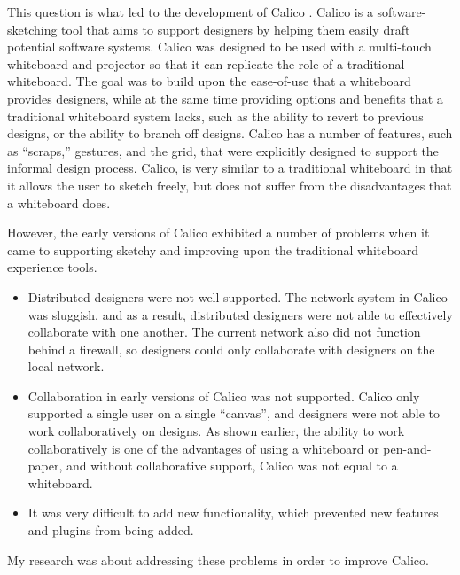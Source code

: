 This question is what led to the development of Calico \cite{calico2}. 
Calico is a software-sketching tool that aims to support designers by helping them easily draft potential software systems. 
Calico was designed to be used with a multi-touch whiteboard and projector so that it can replicate the role of a traditional whiteboard. 
The goal was to build upon the ease-of-use that a whiteboard provides designers, while at the same time providing options and benefits that a traditional whiteboard system lacks, such as the ability to revert to previous designs, or the ability to branch off designs. 
Calico has a number of features, such as ``scraps,'' gestures, and the grid, that were explicitly designed to support the informal design process.
Calico, is very similar to a traditional whiteboard in that it allows the user to sketch freely, but does not suffer from the disadvantages that a whiteboard does.


However, the early versions of Calico exhibited a number of problems when it came to supporting sketchy and improving upon the traditional whiteboard experience tools.
\begin{itemize}\itemsep1pt
\item 
Distributed designers were not well supported.
The network system in Calico was sluggish, and as a result, distributed designers were not able to effectively collaborate with one another. The current network also did not function behind a firewall, so designers could only collaborate with designers on the local network.

\item 
Collaboration in early versions of Calico was not supported. 
Calico only supported a single user on a single ``canvas'', and designers were not able to work collaboratively on designs. 
As shown earlier, the ability to work collaboratively is one of the advantages of using a whiteboard or pen-and-paper, and without collaborative support, Calico was not equal to a whiteboard.

\item
It was very difficult to add new functionality, which prevented new features and plugins from being added. 

\end{itemize}
My research was about addressing these problems in order to improve Calico.


